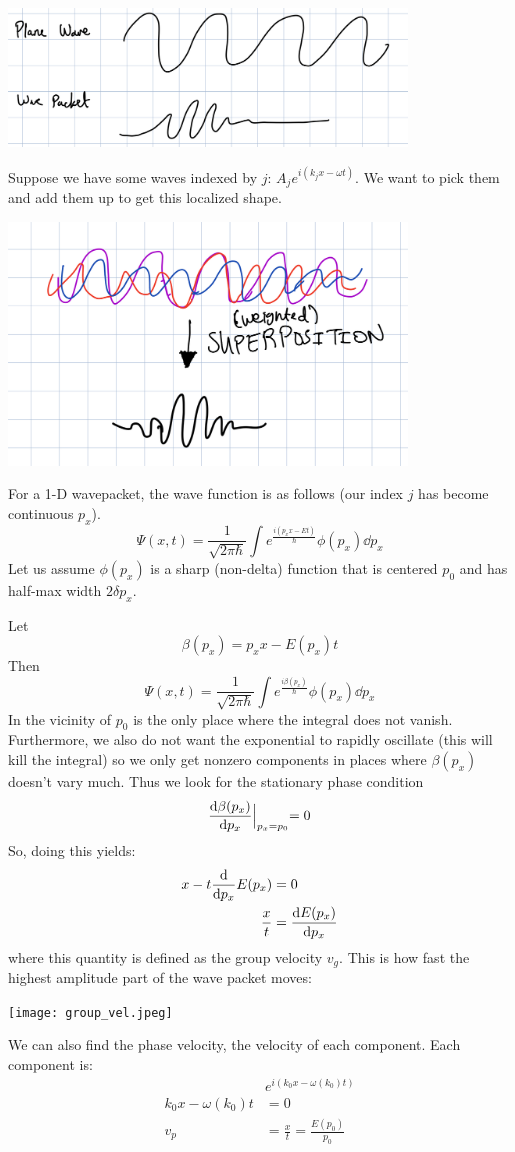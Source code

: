 \includegraphics[width=400px]{../images/wave_packet.jpeg}

Suppose we have some waves indexed by $j$: $A_j e^{i (k_j x - \omega t)}$. We want to pick them and add them up to get this localized shape.

\includegraphics[width=400px]{../images/fourier_sup.jpeg}

For a 1-D wavepacket, the wave function is as follows (our index $j$ has become continuous $p_x$).
\[ \Psi(x, t) = \frac{1}{\sqrt{2 \pi \hbar}} \int e^{\frac{i(p_x x - Et)}{\hbar}} \phi(p_x) \dd{p_x} \]
Let us assume $\phi(p_x)$ is a sharp (non-delta) function that is centered $p_0$ and has half-max width $2 \delta p_x$.

Let
\[ \beta(p_x) = p_x x - E(p_x) t \]
Then
\[ \Psi(x, t) = \frac{1}{\sqrt{2 \pi \hbar}} \int e^{\frac{i\beta(p_x)}{\hbar}} \phi(p_x) \dd{p_x} \]
In the vicinity of $p_0$ is the only place where the integral does not vanish. Furthermore, we also do not want the exponential to rapidly oscillate (this will kill the integral)
so we only get nonzero components in places where $\beta(p_x)$ doesn't vary much. Thus we look for the stationary phase condition
\[ \derivative{\beta(p_x)}{p_x} \Bigl|_{p_x = p_0} = 0 \]
So, doing this yields:
\begin{align*}
    x - t \derivative{}{p_x} E(p_x) &= 0 \\
    \frac{x}{t} &= \derivative{E(p_x)}{p_x}
\end{align*}
where this quantity is defined as the group velocity $v_g$. This is how fast the highest amplitude part of the wave packet moves:

\texttt{[image: group\_vel.jpeg]}

We can also find the phase velocity, the velocity of each component. Each component is:
\begin{align*}
    &e^{i(k_0 x - \omega(k_0) t)} \\
    k_0 x - \omega(k_0)t &= 0 \\
    v_p &= \frac{x}{t} = \frac{E(p_0)}{p_0}
\end{align*}

